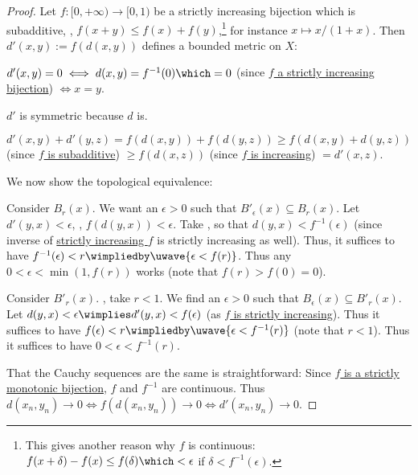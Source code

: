 	\begin{proof}
		Let $f\colon[0, +\infty)\to [0, 1)$ be a strictly increasing bijection which is subadditive, \ie, $f(x + y)\le f(x) + f(y)$,\footnote{
			This gives another reason why $f$ is continuous: $f(x + \delta) - f(x)\le f(\delta) \which < \epsilon$ if $\delta < f^{-1}(\epsilon)$.
		} for instance $x\mapsto x/(1 + x)$. Then $d'(x, y) := f(d(x, y))$ defines a bounded metric on $X$:
		\begin{prooflist}
			\item $d'(x, y) = 0\iff d(x, y) = f^{-1}(0)\which = 0$ (since \uline{$f$ a strictly increasing bijection}) $\iff x = y$.
			
			\item $d'$ is symmetric because $d$ is.
			
			\item $d'(x, y) + d'(y, z) = f(d(x, y)) + f(d(y, z))\ge f(d(x, y) + d(y, z))$ (since \uline{$f$ is subadditive}) $\ge f(d(x, z))$ (since \uline{$f$ is increasing}) $ = d'(x, z)$.
		\end{prooflist}
		
		We now show the topological equivalence:
		\begin{prooflist}
			\item Consider $B_r(x)$. We want an $\epsilon > 0$ such that $B'_\epsilon(x)\subseteq B_r(x)$. Let $d'(y, x) < \epsilon$, \ie, $f(d(y, x)) < \epsilon$. Take , so that $d(y, x) < f^{-1}(\epsilon)$ (since inverse of \uline{strictly increasing $f$} is strictly increasing as well). Thus, it suffices to have $f^{-1}(\epsilon) < r\wimpliedby\uwave{\epsilon < f(r)}$. Thus any $0 < \epsilon < \min(1, f(r))$ works (note that $f(r) > f(0) = 0$).
			
			\item Consider $B'_r(x)$. \Wlogg, take $r < 1$. We find an $\epsilon > 0$ such that $B_\epsilon(x)\subseteq B'_r(x)$. Let $d(y, x) < \epsilon\wimplies d'(y, x) < f(\epsilon)$ (as \uline{$f$ is strictly increasing}). Thus it suffices to have $f(\epsilon) < r\wimpliedby\uwave{\epsilon < f^{-1}(r)}$ (note that \uline{$r < 1$}). Thus it suffices to have $0 < \epsilon < f^{-1}(r)$.\qedhere
		\end{prooflist}
		
		That the Cauchy sequences are the same is straightforward: Since \uline{$f$ is a strictly monotonic bijection}, $f$ and $f^{-1}$ are continuous. Thus $d(x_n, y_n)\to 0\iff f(d(x_n, y_n))\to 0\iff d'(x_n, y_n)\to 0$.
	\end{proof}
	
